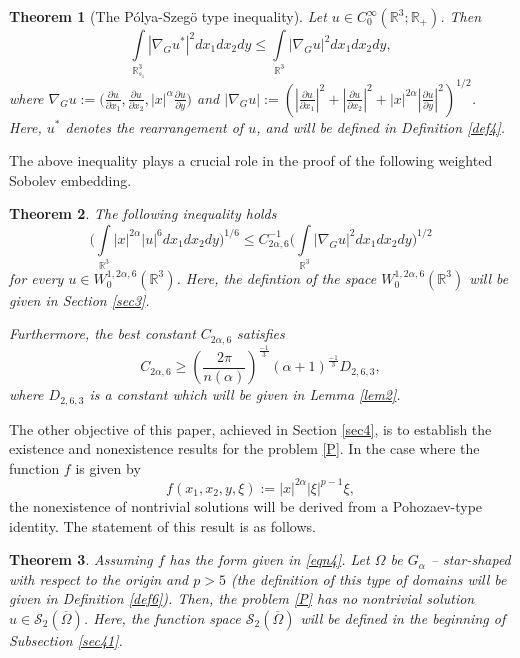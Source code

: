 \documentclass[10pt, reqno]{amsart}
\newtheorem{theorem}{Theorem}
\begin{document}
	\begin{theorem}[The P\'olya-Szeg\"o type inequality]\label{thm2}
		Let $u \in C^\infty_0 ( \mathbb{R}^3; \mathbb{R}_+)$. Then
		$$ \int\limits_{\mathbb{R}^3_{s_1}} \left| \nabla_G u^*\right|^2dx_1dx_2dy \leq \int\limits_{\mathbb{R}^3}\left| \nabla_G u\right|^2dx_1dx_2dy,$$
		where $\nabla_G u := \big(\frac{\partial u}{\partial x_1}, \frac{\partial u}{\partial x_2}, |x|^\alpha \frac{\partial u}{\partial y} \big)$ and $\left|\nabla_G u \right| := \left( |\frac{\partial u}{\partial x_1}|^2 + |\frac{\partial u}{\partial x_2}|^2 + |x|^{2\alpha} |\frac{\partial u}{\partial y}|^2 \right)^{1/2}$. Here, $u^*$ denotes the rearrangement of $u$, and will be defined in Definition \ref{def4}.
	\end{theorem}
	
	The above inequality plays a crucial role in the proof of the following weighted Sobolev embedding.
	
	\begin{theorem}\label{thm3}
		The following inequality holds
		\begin{equation}\label{eqn3}
			\Bigg(\int\limits_{\mathbb{R}^3} |x|^{2\alpha}|u|^{6} dx_1dx_2dy \Bigg)^{1/6} \leq C^{-1}_{2\alpha,6}\Bigg(\int\limits_{\mathbb{R}^3}|\nabla_G u|^2 dx_1dx_2dy\Bigg)^{1/2}
		\end{equation}
		for every $u \in W^{1,2\alpha,6}_0(\mathbb{R}^3)$. Here, the defintion of the space $W^{1,2\alpha,6}_0(\mathbb{R}^3)$ will be given in Section \ref{sec3}.
		
		Furthermore, the best constant $C_{2\alpha,6}$ satisfies
		$$C_{2\alpha,6} \geq \left( \dfrac{2\pi}{n(\alpha)}\right)^{\frac{-1}{3}} (\alpha+1)^{\frac{-1}{3}} D_{2,6,3},$$
		where $D_{2,6,3}$ is a constant which will be given in Lemma \ref{lem2}. 
	\end{theorem}
	
	The other objective of this paper, achieved in Section \ref{sec4}, is to establish the existence and nonexistence results for the problem \eqref{P}. In the case where the function $f$ is given by
	\begin{equation}
		\label{eqn4}
		f(x_1,x_2,y,\xi) := |x|^{2\alpha}|\xi|^{p-1}\xi,
	\end{equation}
	the nonexistence of nontrivial solutions will be derived from a Pohozaev-type identity. The statement of this result is as follows.
	
	\begin{theorem}\label{thm4}
		Assuming $f$ has the form given in \eqref{eqn4}. Let $\Omega$ be $G_\alpha$ -- star-shaped with respect to the origin and $p>5$ (the definition of this type of domains will be given in Definition \ref{def6}). Then, the problem \eqref{P} has no nontrivial solution $u \in \mathcal{S}_2 (\overline{\Omega})$. Here, the function space $\mathcal{S}_2 (\overline{\Omega})$ will be defined in the beginning of Subsection \ref{sec41}.
	\end{theorem}
	
\end{document}
